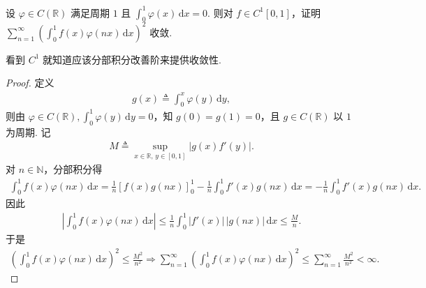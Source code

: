 \documentclass[../../main.tex]{subfiles}%
\begin{document}
\begin{example}
设 $\varphi \in C(\mathbb{R})$ 满足周期 $1$ 且 $\int_0^1 \varphi(x)\,\mathrm{d}x = 0$. 则对 $f \in C^1[0, 1]$，证明 $\sum\limits_{n=1}^\infty \left( \int_0^1 f(x) \varphi(nx)\,\mathrm{d}x \right)^2$ 收敛.
\end{example}
\begin{note}
看到 $C^1$ 就知道应该分部积分改善阶来提供收敛性.
\end{note}
\begin{proof}
定义
\begin{align*}
g(x) \triangleq \int_0^x \varphi(y)\,\mathrm{d}y,
\end{align*}
则由 $\varphi\in C(\mathbb{R}),\int_0^1 \varphi(y)\,\mathrm{d}y=0$，知 $g(0)=g(1)=0$，且 $g\in C(\mathbb{R})$ 以 $1$ 为周期. 记
\begin{align*}
M \triangleq \sup_{x\in\mathbb{R},\, y\in[0,1]} |g(x) f'(y)|.
\end{align*}
对 $n\in\mathbb{N}$，分部积分得
\begin{align*}
\int_0^1 f(x)\varphi(nx)\,\mathrm{d}x
= \frac{1}{n}\left[f(x)g(nx)\right]_0^1 - \frac{1}{n}\int_0^1 f'(x)g(nx)\,\mathrm{d}x= -\frac{1}{n}\int_0^1 f'(x)g(nx)\,\mathrm{d}x.
\end{align*}
因此
\begin{align*}
\left|\int_0^1 f(x)\varphi(nx)\,\mathrm{d}x\right|
\leqslant \frac{1}{n}\int_0^1 |f'(x)|\,|g(nx)|\,\mathrm{d}x 
\leqslant \frac{M}{n}.
\end{align*}
于是
\begin{align*}
\left(\int_0^1 f(x)\varphi(nx)\,\mathrm{d}x\right)^2 \leqslant \frac{M^2}{n^2}\Longrightarrow \sum_{n=1}^\infty \left(\int_0^1 f(x)\varphi(nx)\,\mathrm{d}x\right)^2
\leqslant \sum_{n=1}^\infty \frac{M^2}{n^2} < \infty.
\end{align*}
\end{proof}
\end{document}
